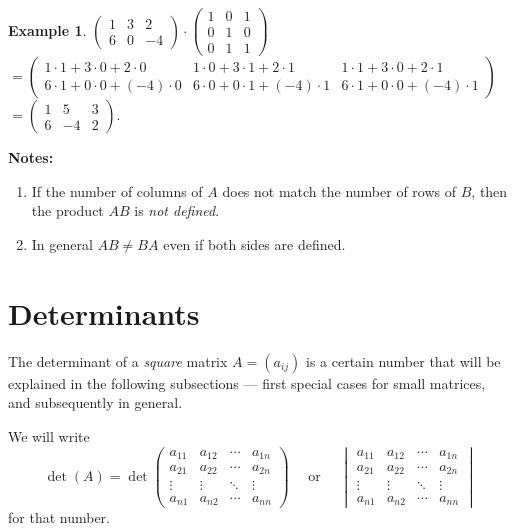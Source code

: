 \documentclass[
  english,
  12pt,
  oneside]{book}
\theoremstyle{definition}
\theoremstyle{definition}
\newtheorem{example}{Example}[chapter]
\theoremstyle{definition}
\theoremstyle{definition}
\theoremstyle{remark}
\begin{document}
\begin{example}
\protect\hypertarget{exm:unnamed-chunk-47}{}\label{exm:unnamed-chunk-47}\(\begin{pmatrix}1 & 3 & 2\\ 6 & 0 & -4\end{pmatrix}\cdot
\begin{pmatrix}1 & 0 & 1\\ 0&1&0 \\ 0& 1 & 1\end{pmatrix}\)\\
\(=\begin{pmatrix}1\cdot1+3\cdot0+2\cdot0& 1\cdot0+3\cdot1+2\cdot1&1\cdot1+3\cdot0+2\cdot1\\ 6\cdot1+0\cdot0+(-4)\cdot0 & 6\cdot0+0\cdot1+(-4)\cdot1 & 6\cdot1+0\cdot0+(-4)\cdot1\end{pmatrix}\)\\
\(=\begin{pmatrix}1&5&3\\6&-4&2\end{pmatrix}\).
\end{example}

\textbf{Notes:}

\begin{enumerate}
\def\labelenumi{(\roman{enumi})}
\item
  If the number of columns of \(A\) does not match the number of rows of \(B\), then the product \(AB\) is \emph{not defined}.
\item
  In general \(AB\not=BA\) even if both sides are defined.
\end{enumerate}

\section{Determinants}\label{determinants}

The determinant of a \emph{square} matrix \(A=(a_{ij})\) is a certain number that will be explained in the following subsections --- first special cases for small matrices, and subsequently in general.

We will write
\[\det(A) = \det
\begin{pmatrix}
    a_{11} & a_{12} & \cdots & a_{1n}\\
    a_{21} & a_{22} & \cdots & a_{2n}\\
    \vdots & \vdots & \ddots & \vdots \\
    a_{n1} & a_{n2} & \cdots & a_{nn}
\end{pmatrix}
\quad\text{ or }\quad
\begin{vmatrix}
    a_{11} & a_{12} & \cdots & a_{1n}\\
    a_{21} & a_{22} & \cdots & a_{2n}\\
    \vdots & \vdots & \ddots & \vdots \\
    a_{n1} & a_{n2} & \cdots & a_{nn}
\end{vmatrix}\]
for that number.
\end{document}
